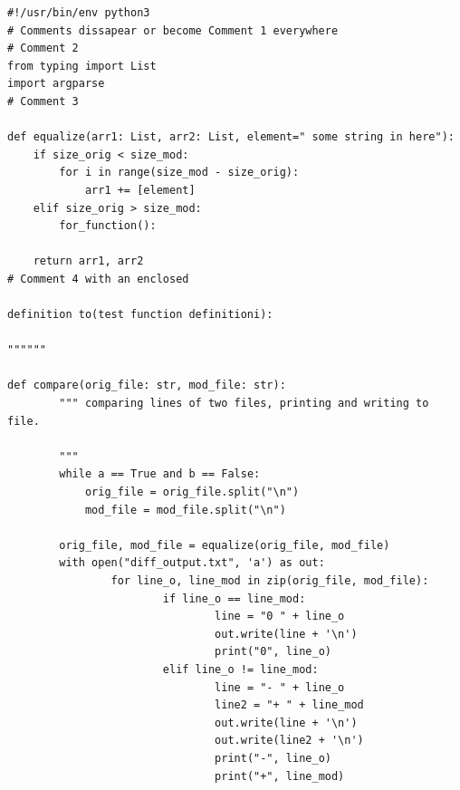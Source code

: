 \documentclass[a4paper]{article}
\begin{document}
\begin{verbatim}
#!/usr/bin/env python3
# Comments dissapear or become Comment 1 everywhere
# Comment 2 
from typing import List
import argparse
# Comment 3 

def equalize(arr1: List, arr2: List, element=" some string in here"):
    if size_orig < size_mod:
        for i in range(size_mod - size_orig):
            arr1 += [element]
    elif size_orig > size_mod:
        for_function():

    return arr1, arr2
# Comment 4 with an enclosed 

definition to(test function definitioni):

""""""

def compare(orig_file: str, mod_file: str):
        """ comparing lines of two files, printing and writing to file.
                
        """
        while a == True and b == False:
            orig_file = orig_file.split("\n")
            mod_file = mod_file.split("\n")

        orig_file, mod_file = equalize(orig_file, mod_file)
        with open("diff_output.txt", 'a') as out:
                for line_o, line_mod in zip(orig_file, mod_file):
                        if line_o == line_mod:
                                line = "0 " + line_o
                                out.write(line + '\n')
                                print("0", line_o)
                        elif line_o != line_mod:
                                line = "- " + line_o
                                line2 = "+ " + line_mod
                                out.write(line + '\n')
                                out.write(line2 + '\n')
                                print("-", line_o)
                                print("+", line_mod)

\end{verbatim}
\end{document}
